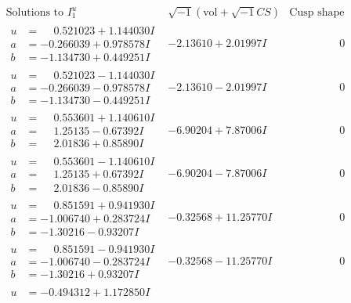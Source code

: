 \documentclass[1p]{elsarticle_modified}
\theoremstyle{definition}
\newcommand{\I}{\sqrt{-1}}
\begin{document}
$$\begin{array}{c|c|c}
\text{Solutions to }I^u_{1}& \I (\text{vol} + \sqrt{-1}CS) & \text{Cusp shape}\\
 \hline 
\begin{aligned}
u &= \phantom{-}0.521023 + 1.144030 I \\
a &= -0.266039 + 0.978578 I \\
b &= -1.134730 + 0.449251 I\end{aligned}
 & -2.13610 + 2.01997 I & \phantom{-0.000000 } 0 \\ \hline\begin{aligned}
u &= \phantom{-}0.521023 - 1.144030 I \\
a &= -0.266039 - 0.978578 I \\
b &= -1.134730 - 0.449251 I\end{aligned}
 & -2.13610 - 2.01997 I & \phantom{-0.000000 } 0 \\ \hline\begin{aligned}
u &= \phantom{-}0.553601 + 1.140610 I \\
a &= \phantom{-}1.25135 - 0.67392 I \\
b &= \phantom{-}2.01836 + 0.85890 I\end{aligned}
 & -6.90204 + 7.87006 I & \phantom{-0.000000 } 0 \\ \hline\begin{aligned}
u &= \phantom{-}0.553601 - 1.140610 I \\
a &= \phantom{-}1.25135 + 0.67392 I \\
b &= \phantom{-}2.01836 - 0.85890 I\end{aligned}
 & -6.90204 - 7.87006 I & \phantom{-0.000000 } 0 \\ \hline\begin{aligned}
u &= \phantom{-}0.851591 + 0.941930 I \\
a &= -1.006740 + 0.283724 I \\
b &= -1.30216 - 0.93207 I\end{aligned}
 & -0.32568 + 11.25770 I & \phantom{-0.000000 } 0 \\ \hline\begin{aligned}
u &= \phantom{-}0.851591 - 0.941930 I \\
a &= -1.006740 - 0.283724 I \\
b &= -1.30216 + 0.93207 I\end{aligned}
 & -0.32568 - 11.25770 I & \phantom{-0.000000 } 0 \\ \hline\begin{aligned}
u &= -0.494312 + 1.172850 I \\

\end{aligned}
\end{array}$$
\end{document}
